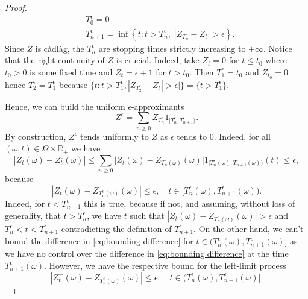 \documentclass[11pt,a4paper,twoside,openany]{report}
\numberwithin{equation}{section}
\theoremstyle{plain} %
\theoremstyle{definition} %
\theoremstyle{remark} %
\begin{document}
\begin{proof}
    \begin{align*}
        &T_0^{\epsilon}=0\\
        &T_{n+1}^{\epsilon}=\inf\left\{t:t>T_{n}^{\epsilon},\;|Z _{T_{n}^{\epsilon}}-Z_t|>\epsilon\right\}.
    \end{align*}
    Since \(Z\) is càdlàg, the \(T_n^{\epsilon}\) are stopping times strictly increasing to \(+\infty\). Notice that the right-continuity of \(Z\) is crucial. Indeed, take \(Z_t=0\) for \(t\leq t_0\) where \(t_0>0\) is some fixed time and \(Z_t=\epsilon+1\) for \(t>t_0\). Then \(T_1^{\epsilon}=t_0\) and \(Z_{t_0}=0\) hence \(T_2^{\epsilon}=T_1^{\epsilon}\) because \(\{t:t>T_1^{\epsilon},|Z _{T_{2}^{\epsilon}}-Z_t|>\epsilon|\}=\{t>T_1^{\epsilon}\}\). 
    
    
 Hence, we can build the uniform \(\epsilon\)-approximants
    \begin{equation*}
        Z^{\epsilon}=\sum_{n\geq 0} Z_{T_n^{\epsilon}}1_{[T_{n}^{\epsilon},T_{n+1}^{\epsilon})}.
    \end{equation*}
 By construction, \(Z^{\epsilon}\) tends uniformly to \(Z\) as \(\epsilon\) tends to \(0\). Indeed, for all \((\omega,t)\in\Omega\times\mathbb{R}_+\) we have 
    \begin{equation*}
        |Z_t(\omega)-Z_t^{\epsilon}(\omega)|\leq\sum_{n\geq 0}\big|Z_{t}(\omega)-Z_{T_n^{\epsilon}(\omega)}(\omega)\big|1_{\big[T_{n}^{\epsilon}(\omega),T_{n+1}^{\epsilon}(\omega)\big)}(t)\leq\epsilon,
    \end{equation*}
    because 
    \begin{equation}\label{eq:bounding difference}
        |Z_{t}(\omega)-Z_{T_n^{\epsilon}(\omega)}(\omega)|\leq\epsilon,\quad t\in\big[T_{n}^{\epsilon}(\omega),T_{n+1}^{\epsilon}(\omega)\big).
    \end{equation}
 Indeed, for \(t<T_{n+1}^{\epsilon}\) this is true, because if not, and assuming, without loss of generality, that \(t>T_{n}^{\epsilon}\), we have \(t\) such that \(|Z_{t}(\omega)-Z_{T_n^{\epsilon}(\omega)}(\omega)|>\epsilon\) and \(T_{n}^{\epsilon}<t<T_{n+1}^{\epsilon}\) contradicting the definition of \(T_{n+1}^{\epsilon}\). On the other hand, we can't bound the difference in \eqref{eq:bounding difference} for \(t\in \big(T_{n}^{\epsilon}(\omega),T_{n+1}^{\epsilon}(\omega)\big]\) as we have no control over the difference in \eqref{eq:bounding difference} at the time \(T_{n+1}^{\epsilon}(\omega)\). However, we have the respective bound for the left-limit process
 \begin{equation*}
       |Z_{t}^-(\omega)-Z_{T_n^{\epsilon}(\omega)}(\omega)|\leq\epsilon,\quad t\in\big(T_{n}^{\epsilon}(\omega),T_{n+1}^{\epsilon}(\omega)\big].

\end{equation*}
\end{proof}
\end{document}
